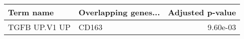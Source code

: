 \begin{tabular}{llr}
\toprule
    Term name & Overlapping genes... &  Adjusted p-value \\
\midrule
TGFB UP.V1 UP &                CD163 &          9.60e-03 \\
\bottomrule
\end{tabular}
